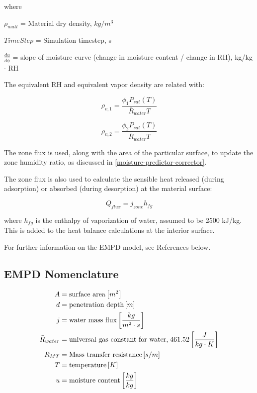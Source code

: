 where

$\rho_{matl}$ = Material dry density, $kg/m^3$

$TimeStep$ = Simulation timestep, s

$\frac {du}{d\phi}$ = slope of moisture curve (change in moisture content / change in RH), kg/kg $\cdot$ RH

The equivalent RH and equivalent vapor density are related with:

\begin{equation}
\rho_{v,1} = \frac {\phi_{1} P_{sat}(T)} {\bar R_{water} T}
\end{equation}

\begin{equation}
\rho_{v,2} = \frac {\phi_{2} P_{sat}(T)} {\bar R_{water} T}
\end{equation}

The zone flux is used, along with the area of the particular surface, to update the zone humidity ratio, as discussed in \ref{moisture-predictor-corrector}.

The zone flux is also used to calculate the sensible heat released (during adsorption) or absorbed (during desorption) at the material surface:

\begin{equation}
Q_{flux} = j_{zone} h_{fg}
\end{equation}

where \(h_{fg}\) is the enthalpy of vaporization of water, assumed to be 2500 kJ/kg. This is added to the heat balance calculations at the interior surface.

For further information on the EMPD model, see References below.

\subsection{EMPD Nomenclature}\label{empd-nomenclature}
\begin{align*}
  A  &= \text{surface area} \left[m^{2}\right] \\
  d &= \text{penetration depth} \left[m\right] \\
  j &= \text{water mass flux} \left[\frac{kg}{m^{2} \cdot s}\right] \\
  \bar R_{water} &= \text{universal gas constant for water,} \; 461.52 \left[\frac{J}{kg \cdot K}\right]   \\
  R_{MT} &= \text{Mass transfer resistance} \left[s/m\right] \\
  T &= \text{temperature} \left[K\right] \\
  u &= \text{moisture content} \left[\frac{kg}{kg}\right]
\end{align*}

